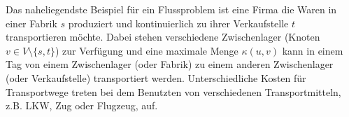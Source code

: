 Das naheliegendste Beispiel für ein Flussproblem ist eine 
Firma die Waren in einer Fabrik $s$ produziert und 
kontinuierlich zu ihrer Verkaufstelle $t$ transportieren möchte. 
Dabei stehen verschiedene Zwischenlager 
(Knoten $v \in V \setminus \{s,t\}$) zur Verfügung und eine 
maximale Menge $\kappa(u,v)$ kann in einem Tag von einem 
Zwischenlager (oder Fabrik) zu einem anderen Zwischenlager 
(oder Verkaufstelle) transportiert werden. Unterschiedliche Kosten
für Transportwege treten bei dem Benutzten von verschiedenen 
Transportmitteln, z.B. LKW, Zug oder Flugzeug, auf. \cite{schoening, algo}

%
%


